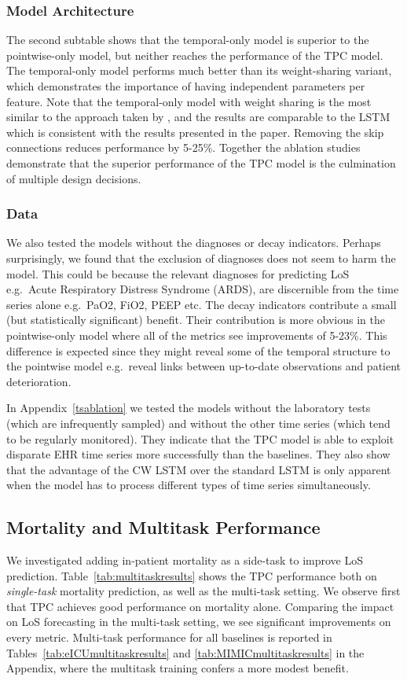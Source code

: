 \documentclass[sigconf]{acmart}
\begin{document}
\subsubsection{Model Architecture}
The second subtable shows that the temporal-only model is superior to the pointwise-only model, but neither reaches the performance of the TPC model. The temporal-only model performs much better than its weight-sharing variant, which demonstrates the importance of having independent parameters per feature. Note that the temporal-only model with weight sharing is the most similar to the approach taken by \citet{sontag}, and the results are comparable to the LSTM which is consistent with the results presented in the paper. Removing the skip connections reduces performance by 5-25\%. Together the ablation studies demonstrate that the superior performance of the TPC model is the culmination of multiple design decisions.

\subsubsection{Data}
We also tested the models without the diagnoses or decay indicators. Perhaps surprisingly, we found that the exclusion of diagnoses does not seem to harm the model. This could be because the relevant diagnoses for predicting LoS e.g.\ Acute Respiratory Distress Syndrome (ARDS), are discernible from the time series alone e.g.\ PaO2, FiO2, PEEP etc. The decay indicators contribute a small (but statistically significant) benefit. Their contribution is more obvious in the pointwise-only model where all of the metrics see improvements of 5-23\%. This difference is expected since they might reveal some of the temporal structure to the pointwise model e.g.\ reveal links between up-to-date observations and patient deterioration. 

In Appendix~\ref{tsablation} we tested the models without the laboratory tests (which are infrequently sampled) and without the other time series (which tend to be regularly monitored). They indicate that the TPC model is able to exploit disparate EHR time series more successfully than the baselines. They also show that the advantage of the CW LSTM over the standard LSTM is only apparent when the model has to process different types of time series simultaneously.

\subsection{Mortality and Multitask Performance}
We investigated adding in-patient mortality as a side-task to improve LoS prediction. Table~\ref{tab:multitaskresults} shows the TPC performance both on \emph{single-task} mortality prediction, as well as the multi-task setting. We observe first that TPC achieves good performance on mortality alone. Comparing the impact on LoS forecasting in the multi-task setting, we see significant improvements on every metric. Multi-task performance for all baselines is reported in Tables~\ref{tab:eICUmultitaskresults} and \ref{tab:MIMICmultitaskresults} in the Appendix, where the multitask training confers a more modest benefit.
\end{document}
